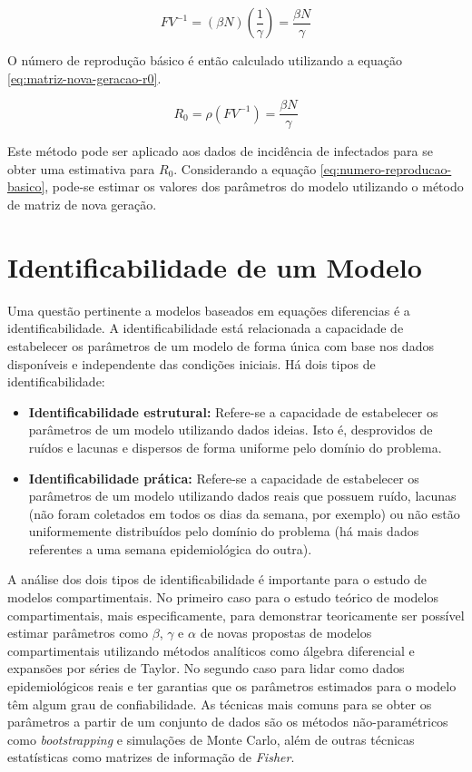 \begin{equation}
FV^{-1} = (\beta N)\left(\frac{1}{\gamma}\right) = \frac{\beta N}{\gamma}
\end{equation}

O número de reprodução básico é então calculado utilizando a equação 
\ref{eq:matriz-nova-geracao-r0}.

\begin{equation}\label{eq:matriz-nova-geracao-r0}
R_0 = \rho(FV^{-1}) = \frac{\beta N}{\gamma} 
\end{equation}

Este método pode ser aplicado aos dados de incidência de infectados para se obter
uma estimativa para $R_0$. 
Considerando a equação \ref{eq:numero-reproducao-basico}, pode-se estimar os valores
dos parâmetros do modelo utilizando o método de matriz de nova geração.

\section{Identificabilidade de um Modelo}

Uma questão pertinente a modelos baseados em equações diferencias é a 
identificabilidade. A identificabilidade está relacionada a capacidade de 
estabelecer os parâmetros de um modelo de forma única com base nos dados disponíveis
e independente das condições iniciais. Há dois tipos de identificabilidade:
\begin{itemize}
    \item \textbf{Identificabilidade estrutural:} Refere-se a capacidade de estabelecer
    os parâmetros de um modelo utilizando dados ideias. Isto é, desprovidos de ruídos
    e lacunas e dispersos de forma uniforme pelo domínio do problema. 
    \item \textbf{Identificabilidade prática:} Refere-se a capacidade de estabelecer
    os parâmetros de um modelo utilizando dados reais que possuem ruído, lacunas 
    (não foram coletados em todos os dias da semana, por exemplo) ou não estão uniformemente
    distribuídos pelo domínio do problema (há mais dados referentes a uma semana epidemiológica
    do outra).
\end{itemize}
A análise dos dois tipos de identificabilidade é importante para o estudo de 
modelos compartimentais. No primeiro caso para o estudo teórico de modelos 
compartimentais, mais especificamente, para demonstrar teoricamente ser possível 
estimar parâmetros como $\beta$, $\gamma$ e $\alpha$ de novas propostas de modelos 
compartimentais utilizando métodos analíticos como álgebra diferencial e 
expansões por séries de Taylor. 
No segundo caso para lidar como dados epidemiológicos reais e ter garantias que os
parâmetros estimados para o modelo têm algum grau de confiabilidade. As técnicas
mais comuns para se obter os parâmetros a partir de um conjunto de dados são os 
métodos não-paramétricos como \textit{bootstrapping} e simulações de Monte Carlo, 
além de outras técnicas estatísticas como matrizes de informação de \textit{Fisher}.  

